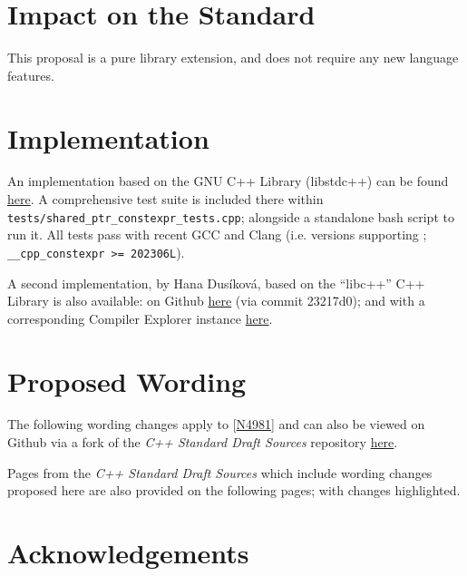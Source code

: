 \documentclass[10pt]{article}
\newcommand*{\wgxxi}[1]{[\href{https://wg21.link/#1}{#1}]}
\newcommand*{\upstreamcommit}{2a74dc7}
\newcommand*{\forkcommit}{fa9cf47}
\begin{document}
\section{Impact on the Standard}

This proposal is a pure library extension, and does not require any new
language features.

\section{Implementation}

An implementation based on the GNU C++ Library (libstdc++) can be found
\href{https://github.com/SCT4SP/constexpr_shared_ptr}{here}. A comprehensive
test suite is included there within
\texttt{tests/shared\_ptr\_constexpr\_tests.cpp}; alongside a standalone bash
script to run it. All tests pass with recent GCC and Clang (i.e. versions
supporting \cite{P2738R1}; \texttt{\_\_cpp\_constexpr >= 202306L}).

A second implementation, by Hana Dusíková, based on the ``libc++'' C++ Library
is also available: on Github
\href{https://github.com/hanickadot/llvm-project/tree/P3309-constexpr-atomic-and-atomic-ref}{here}
(via commit 23217d0); and with a corresponding Compiler Explorer instance
\href{https://compiler-explorer.com/z/8cj7nc1no}{here}.

\section{Proposed Wording}
\label{sec:wording}

The following wording changes apply to \wgxxi{N4981} and can also
be viewed on Github via a fork of the \emph{C++ Standard Draft Sources}
repository
\href{https://github.com/cplusplus/draft/compare/\upstreamcommit...pkeir:draft:\forkcommit}{here}.

Pages from the \emph{C++ Standard Draft Sources} which include wording changes
proposed here are also provided on the following pages; with changes
highlighted.



\section{Acknowledgements}
\end{document}
